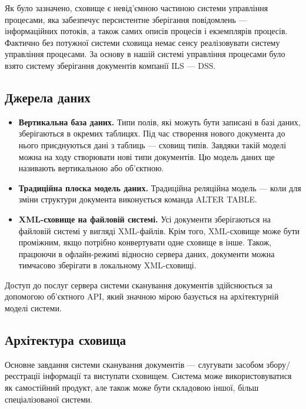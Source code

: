 \documentclass{memoir}
\begin{document}
Як було зазначено, сховище є невід’ємною частиною системи управління процесами, яка забезпечує персистентне зберігання повідомлень — інформаційних потоків, а також самих описів процесів і екземплярів процесів. Фактично без потужної системи сховища немає сенсу реалізовувати систему управління процесами. За основу в нашій системі управління процесами було взято систему зберігання документів компанії ILS — DSS.

\subsection{Джерела даних}

\begin{itemize}
    \item \textbf{Вертикальна база даних.} Типи полів, які можуть бути записані в базі даних, зберігаються в окремих таблицях. Під час створення нового документа до нього приєднуються дані з таблиць — сховищ типів. Завдяки такій моделі можна на ходу створювати нові типи документів. Цю модель даних ще називають вертикальною або об’єктною.
    \item \textbf{Традиційна плоска модель даних.} Традиційна реляційна модель — коли для зміни структури документа виконується команда ALTER TABLE.
    \item \textbf{XML-сховище на файловій системі.} Усі документи зберігаються на файловій системі у вигляді XML-файлів. Крім того, XML-сховище може бути проміжним, якщо потрібно конвертувати одне сховище в інше. Також, працюючи в офлайн-режимі відносно сервера даних, документи можна тимчасово зберігати в локальному XML-сховищі.
\end{itemize}

Доступ до послуг сервера системи сканування документів здійснюється за допомогою об’єктного API, який значною мірою базується на архітектурній моделі системи.

\subsection{Архітектура сховища}

Основне завдання системи сканування документів — слугувати засобом збору/реєстрації інформації та виступати сховищем. Система може використовуватися як самостійний продукт, але також може бути складовою іншої, більш спеціалізованої системи.
\end{document}
